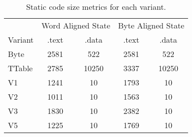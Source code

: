 \begin{table}[pt]
\centering
\begin{tabular}{l|cc|cc}
 &
\multicolumn{2}{c}{Word Aligned State} &
\multicolumn{2}{c}{Byte Aligned State}  \\
Variant     & .text & .data & .text & .data  \\ \hline
Byte        & 2581  & 522   & 2581  & 522    \\
TTable      & 2785  & 10250 & 3337  & 10250  \\
V1          & 1241  & 10    & 1793  & 10     \\
V2          & 1011  & 10    & 1563  & 10     \\
V3          & 1830  & 10    & 2382  & 10     \\
V5          & 1225  & 10    & 1769  & 10     \\
\end{tabular}
\caption{
Static code size metrics for each variant.
}
\label{tab:eval:sw:size}
\end{table}

